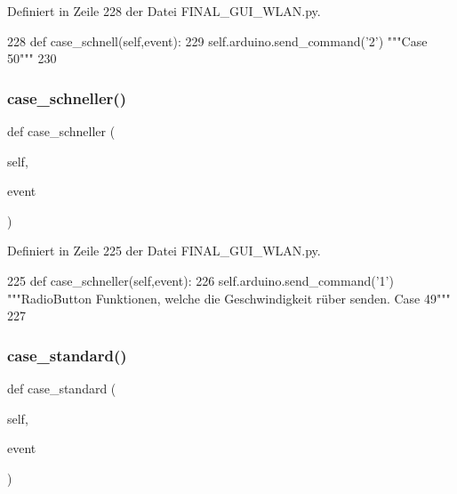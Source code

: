 Definiert in Zeile 228 der Datei F\+I\+N\+A\+L\+\_\+\+G\+U\+I\+\_\+\+W\+L\+A\+N.\+py.


\begin{DoxyCode}
228     \textcolor{keyword}{def }case\_schnell(self,event):
229         self.arduino.send\_command(\textcolor{stringliteral}{'2'})  \textcolor{stringliteral}{"""Case 50"""}
230 
\end{DoxyCode}
\mbox{\label{class_f_i_n_a_l___g_u_i___w_l_a_n_1_1_w_l_a_n_a384a44af596f649b47f3e86d8699ed96}} 
\subsubsection{\texorpdfstring{case\+\_\+schneller()}{case\_schneller()}}
{\footnotesize\ttfamily def case\+\_\+schneller (\begin{DoxyParamCaption}\item[{}]{self,  }\item[{}]{event }\end{DoxyParamCaption})}



Definiert in Zeile 225 der Datei F\+I\+N\+A\+L\+\_\+\+G\+U\+I\+\_\+\+W\+L\+A\+N.\+py.


\begin{DoxyCode}
225     \textcolor{keyword}{def }case\_schneller(self,event):
226         self.arduino.send\_command(\textcolor{stringliteral}{'1'})  \textcolor{stringliteral}{"""RadioButton Funktionen, welche die Geschwindigkeit rüber senden.
       Case 49"""}
227 
\end{DoxyCode}
\mbox{\label{class_f_i_n_a_l___g_u_i___w_l_a_n_1_1_w_l_a_n_a9ff9a561fae985eb00e1bac777770476}} 
\subsubsection{\texorpdfstring{case\+\_\+standard()}{case\_standard()}}
{\footnotesize\ttfamily def case\+\_\+standard (\begin{DoxyParamCaption}\item[{}]{self,  }\item[{}]{event }\end{DoxyParamCaption})}



